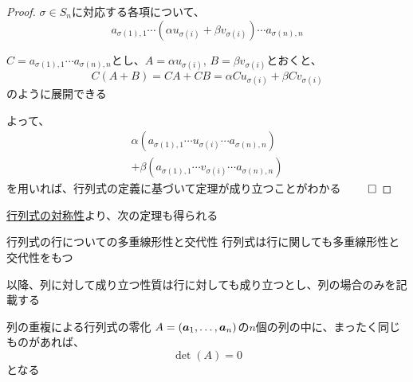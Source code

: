 \documentclass[../../../topic_linear-algebra]{subfiles}
\begin{document}
\begin{proof}
  $\sigma \in S_n$に対応する各項について、
  \begin{equation*}
    a_{\sigma(1),1} \cdots (\alpha u_{\sigma(i)} + \beta v_{\sigma(i)}) \cdots a_{\sigma(n),n}
  \end{equation*}

  $C = a_{\sigma(1),1} \cdots a_{\sigma(n),n}$とし、$A = \alpha u_{\sigma(i)}, \, B = \beta v_{\sigma(i)}$とおくと、
  \begin{equation*}
    C(A + B) = CA + CB = \alpha C u_{\sigma(i)} + \beta C v_{\sigma(i)}
  \end{equation*}
  のように展開できる

  よって、
  \begin{multline*}
    \alpha (a_{\sigma(1),1} \cdots u_{\sigma(i)} \cdots a_{\sigma(n),n}) \\
    + \beta(a_{\sigma(1),1} \cdots v_{\sigma(i)} \cdots a_{\sigma(n),n})
  \end{multline*}
  を用いれば、行列式の定義に基づいて定理が成り立つことがわかる $\qed$
\end{proof}

\sectionline

\hyperref[thm:determinant-transpose-invariance]{行列式の対称性}より、次の定理も得られる

\begin{theorem}{行列式の行についての多重線形性と交代性}
  行列式は行に関しても多重線形性と交代性をもつ
\end{theorem}

以降、列に対して成り立つ性質は行に対しても成り立つとし、列の場合のみを記載する

\sectionline

\begin{theorem}{列の重複による行列式の零化}
  $A = (\vb*{a}_1, \ldots, \vb*{a}_n)$の$n$個の列の中に、まったく同じものがあれば、
  \begin{equation*}
    \det(A) = 0
  \end{equation*}
  となる
\end{theorem}
\end{document}
